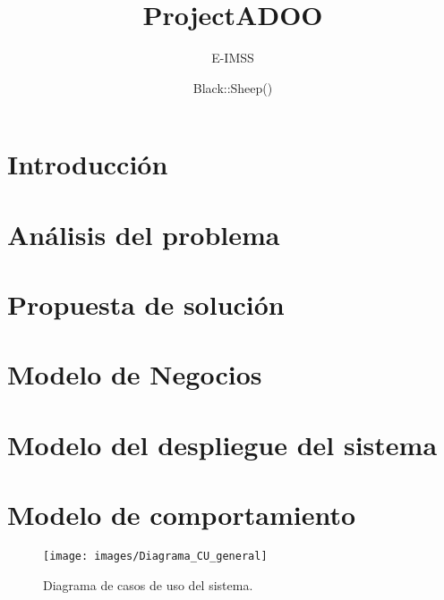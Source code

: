 \documentclass[oneside,10pt]{book}
\title{ProjectADOO}
\subtitle{E-IMSS}
\author{Black::Sheep()}
\begin{document}
\maketitle
\thispagestyle{empty}


\tableofcontents



\chapter{Introducción}


\chapter{Análisis del problema}


\chapter{Propuesta de solución}




\chapter{Modelo de Negocios}


\chapter{Modelo del despliegue del sistema}

\chapter{Modelo de comportamiento}
	
	\begin{figure}[htbp!]
		\centering
			\texttt{[image: images/Diagrama\_CU\_general]}
		\caption{Diagrama de casos de uso del sistema.}
	\end{figure}
	
\end{document}
